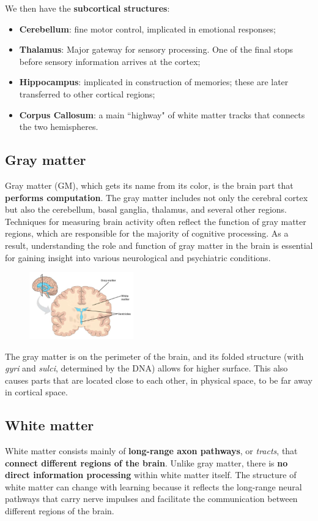 We then have the \textbf{subcortical structures}:
\begin{itemize}
    \item \textbf{Cerebellum}: fine motor control, implicated in emotional responses;
    \item \textbf{Thalamus}: Major gateway for sensory processing. One of the final stops before sensory information arrives at the cortex;
    \item \textbf{Hippocampus}: implicated in construction of memories; these are later transferred to other cortical regions;
    \item \textbf{Corpus Callosum}: a main ``highway" of white matter tracks that connects the two hemispheres.
\end{itemize}

\subsection{Gray matter}
Gray matter (GM), which gets its name from its color, is the brain part that \textbf{performs computation}. The gray matter includes not only the cerebral cortex but also the cerebellum, basal ganglia, thalamus, and several other regions. Techniques for measuring brain activity often reflect the function of gray matter regions, which are responsible for the majority of cognitive processing. As a result, understanding the role and function of gray matter in the brain is essential for gaining insight into various neurological and psychiatric conditions.

\begin{figure}
  \centering
  \includegraphics[width=0.4\textwidth]{images/brain_2.png}
\end{figure}

The gray matter is on the perimeter of the brain, and its folded structure (with \textit{gyri} and \textit{sulci}, determined by the DNA) allows for higher surface. This also causes parts that are located close to each other, in physical space, to be far away in cortical space.

\subsection{White matter}
White matter consists mainly of \textbf{long-range axon pathways}, or \textit{tracts}, that \textbf{connect different regions of the brain}. Unlike gray matter, there is \textbf{no direct information processing} within white matter itself. The structure of white matter can change with learning because it reflects the long-range neural pathways that carry nerve impulses and facilitate the communication between different regions of the brain. 

